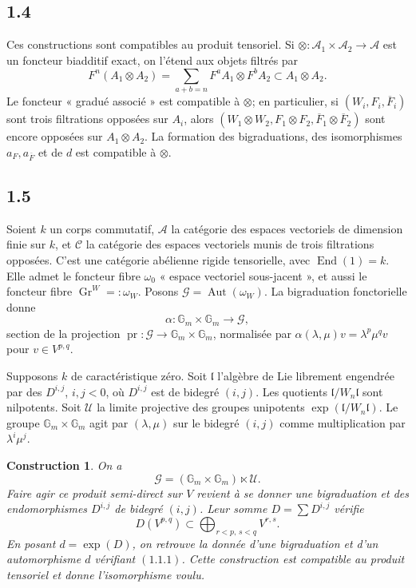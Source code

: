\documentclass[11pt]{article}
\newtheorem{construction}{Construction}[section]
\newcommand{\Gr}{\operatorname{Gr}}
\newcommand{\Aut}{\operatorname{Aut}}
\newcommand{\End}{\operatorname{End}}
\newcommand{\Gm}{\mathbb G_m}
\begin{document}
\subsection*{1.4}
Ces constructions sont compatibles au produit tensoriel. Si \(\otimes:\mathcal A_1\times\mathcal A_2\to\mathcal A\) est un foncteur biadditif exact, on l'étend aux objets filtrés par
\[
 F^n(A_1\otimes A_2)=\sum_{a+b=n}F^aA_1\otimes F^bA_2\subset A_1\otimes A_2.
\]
Le foncteur « gradué associé » est compatible à \(\otimes\); en particulier, si \((W_i,F_i,\overline F_i)\) sont trois filtrations opposées sur \(A_i\), alors \((W_1\otimes W_2,F_1\otimes F_2,\overline F_1\otimes\overline F_2)\) sont encore opposées sur \(A_1\otimes A_2\). La formation des bigraduations, des isomorphismes \(a_F,a_{\overline F}\) et de \(d\) est compatible à \(\otimes\).

\subsection*{1.5}
Soient \(k\) un corps commutatif, \(\mathcal A\) la catégorie des espaces vectoriels de dimension finie sur \(k\), et \(\mathcal C\) la catégorie des espaces vectoriels munis de trois filtrations opposées. C'est une catégorie abélienne rigide tensorielle, avec \(\End(1)=k\). Elle admet le foncteur fibre \(\omega_0\) « espace vectoriel sous-jacent », et aussi le foncteur fibre \(\Gr^W=:\omega_W\). Posons \(\mathcal G=\Aut(\omega_W)\). La bigraduation fonctorielle donne
\[
 \alpha:\Gm\times\Gm\longrightarrow\mathcal G,
\]
section de la projection \(\operatorname{pr}:\mathcal G\to\Gm\times\Gm\), normalisée par \(\alpha(\lambda,\mu)v=\lambda^p\mu^qv\) pour \(v\in V^{p,q}\).

Supposons \(k\) de caractéristique zéro. Soit \(\mathfrak l\) l'algèbre de Lie librement engendrée par des \(D^{i,j}\), \(i,j<0\), où \(D^{i,j}\) est de bidegré \((i,j)\). Les quotients \(\mathfrak l/W_n\mathfrak l\) sont nilpotents. Soit \(\mathcal U\) la limite projective des groupes unipotents \(\exp(\mathfrak l/W_n\mathfrak l)\). Le groupe \(\Gm\times\Gm\) agit par \((\lambda,\mu)\) sur le bidegré \((i,j)\) comme multiplication par \(\lambda^i\mu^j\).

\begin{construction}
On a
\[
 \mathcal G=(\Gm\times\Gm)\ltimes\mathcal U.
\]
Faire agir ce produit semi-direct sur \(V\) revient à se donner une bigraduation et des endomorphismes \(D^{i,j}\) de bidegré \((i,j)\). Leur somme \(D=\sum D^{i,j}\) vérifie
\[
 D(V^{p,q})\subset\bigoplus_{r<p,\,s<q}V^{r,s}.
\]
En posant \(d=\exp(D)\), on retrouve la donnée d'une bigraduation et d'un automorphisme \(d\) vérifiant \((1.1.1)\). Cette construction est compatible au produit tensoriel et donne l'isomorphisme voulu.
\end{construction}
\end{document}
